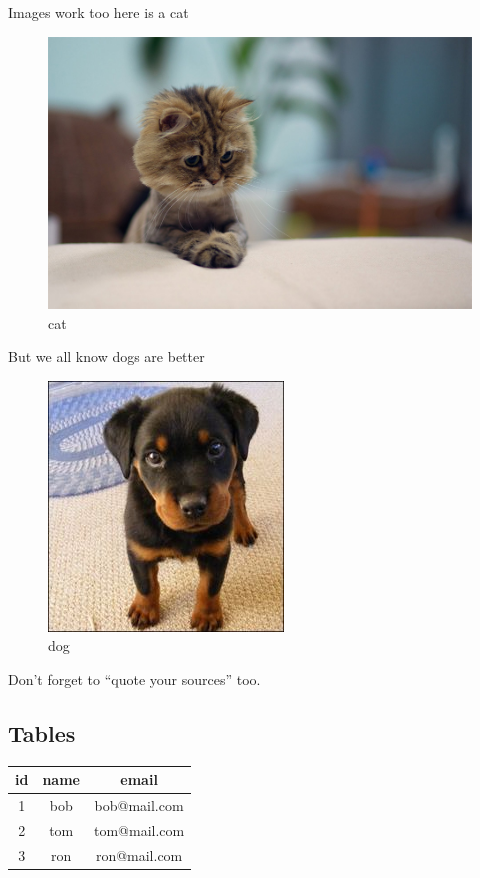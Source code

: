 \documentclass{article}
\begin{document}
Images work too here is a cat \begin{figure}[h]
\caption{cat}
\centering
\includegraphics{cat.jpg}
\end{figure}

But we all know dogs are better

\begin{figure}[h]
\caption{dog}
\centering
\includegraphics{dog}
\end{figure}

Don't forget to ``quote your sources'' too.

\subsection{Tables}

\noindent
\begin{tabular}{| c | c | c |}
\hline 

id
&
name
&
email
\\
\hline 

1
&
bob
&
bob@mail.com
\\
\hline 

2
&
tom
&
tom@mail.com
\\
\hline 

3
&
ron
&
ron@mail.com
\\
\hline 
\end{tabular}
\end{document}

